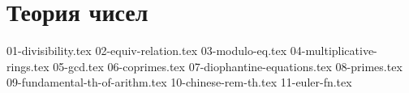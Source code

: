 \section{Теория чисел}
{01-divisibility.tex}
{02-equiv-relation.tex}
{03-modulo-eq.tex}
{04-multiplicative-rings.tex}
{05-gcd.tex}
{06-coprimes.tex}
{07-diophantine-equations.tex}
{08-primes.tex}
{09-fundamental-th-of-arithm.tex}
{10-chinese-rem-th.tex}
{11-euler-fn.tex}
